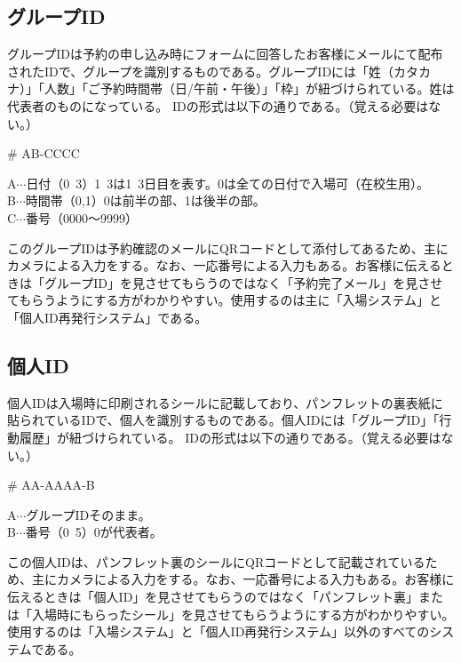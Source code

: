 \documentclass[a4paper]{ltjsreport}
\begin{document}
\subsection{グループID}
グループIDは予約の申し込み時にフォームに回答したお客様にメールにて配布されたIDで、グループを識別するものである。グループIDには「姓（カタカナ）」「人数」「ご予約時間帯（日/午前・午後）」「枠」が紐づけられている。姓は代表者のものになっている。
IDの形式は以下の通りである。（覚える必要はない。）
\begin{screen}
  \begin{center}
    {\huge \# AB-CCCC}\\
  \end{center}
  A$\cdots$日付（0~3）1~3は1~3日目を表す。0は全ての日付で入場可（在校生用）。\\
  B$\cdots$時間帯（0,1）0は前半の部、1は後半の部。\\
  C$\cdots$番号（0000〜9999）
\end{screen}
このグループIDは予約確認のメールにQRコードとして添付してあるため、主にカメラによる入力をする。なお、一応番号による入力もある。お客様に伝えるときは「グループID」を見させてもらうのではなく「予約完了メール」を見させてもらうようにする方がわかりやすい。使用するのは主に「入場システム」と「個人ID再発行システム」である。
\subsection{個人ID}
個人IDは入場時に印刷されるシールに記載しており、パンフレットの裏表紙に貼られているIDで、個人を識別するものである。個人IDには「グループID」「行動履歴」が紐づけられている。
IDの形式は以下の通りである。（覚える必要はない。）
\begin{screen}
  \begin{center}
    {\huge \# AA-AAAA-B}\\
  \end{center}
  A$\cdots$グループIDそのまま。\\
  B$\cdots$番号（0~5）0が代表者。
\end{screen}
この個人IDは、パンフレット裏のシールにQRコードとして記載されているため、主にカメラによる入力をする。なお、一応番号による入力もある。お客様に伝えるときは「個人ID」を見させてもらうのではなく「パンフレット裏」または「入場時にもらったシール」を見させてもらうようにする方がわかりやすい。使用するのは「入場システム」と「個人ID再発行システム」以外のすべてのシステムである。
\end{document}
